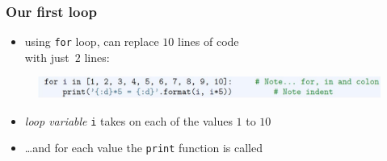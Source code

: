\documentclass[english,14pt]{beamer}
\newcommand\red[1]{{\color{red} #1}}
\begin{document}

\begin{frame}[fragile]

\frametitle{Our first loop}

\begin{itemize}
	\item using \texttt{for} loop, can replace $10$ lines of code \\ with just~$2$ lines:
\end{itemize}

\begin{figure}[ht]
	\centering
	\includegraphics[width=\textwidth]{figures/LLp60b}
\end{figure}

\begin{itemize}
	\item \red{\emph{loop variable}} \texttt{i} takes on each of the values $1$ to $10$
	\item \ldots and for each value the \texttt{print} function is called
\end{itemize}

\end{frame}

\end{document}

